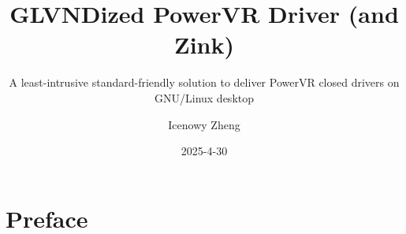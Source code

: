 \documentclass{beamer}
\title{GLVNDized PowerVR Driver (and Zink)}
\subtitle{A least-intrusive standard-friendly solution to deliver PowerVR closed drivers on GNU/Linux desktop}
\author{Icenowy Zheng}
\institute{PLCT Lab}
\date{2025-4-30}
\begin{document}
\section{Preface}

\frame{\titlepage}

\begin{frame}
    \frametitle{}
\end{frame}
\end{document}
